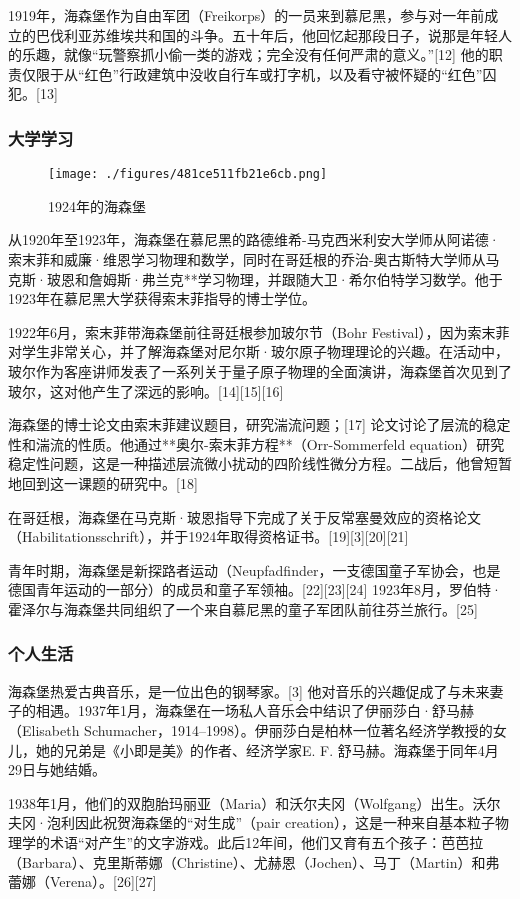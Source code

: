 1919年，海森堡作为自由军团（Freikorps）的一员来到慕尼黑，参与对一年前成立的巴伐利亚苏维埃共和国的斗争。五十年后，他回忆起那段日子，说那是年轻人的乐趣，就像“玩警察抓小偷一类的游戏；完全没有任何严肃的意义。”[12] 他的职责仅限于从“红色”行政建筑中没收自行车或打字机，以及看守被怀疑的“红色”囚犯。[13]  
\subsubsection{大学学习}
\begin{figure}[ht]
\centering
\texttt{[image: ./figures/481ce511fb21e6cb.png]}
\caption{1924年的海森堡} \label{fig_Heisen_1}
\end{figure}
从1920年至1923年，海森堡在慕尼黑的路德维希-马克西米利安大学师从阿诺德·索末菲和威廉·维恩学习物理和数学，同时在哥廷根的乔治-奥古斯特大学师从马克斯·玻恩和詹姆斯·弗兰克**学习物理，并跟随大卫·希尔伯特学习数学。他于1923年在慕尼黑大学获得索末菲指导的博士学位。  

1922年6月，索末菲带海森堡前往哥廷根参加玻尔节（Bohr Festival），因为索末菲对学生非常关心，并了解海森堡对尼尔斯·玻尔原子物理理论的兴趣。在活动中，玻尔作为客座讲师发表了一系列关于量子原子物理的全面演讲，海森堡首次见到了玻尔，这对他产生了深远的影响。[14][15][16]  

海森堡的博士论文由索末菲建议题目，研究湍流问题；[17] 论文讨论了层流的稳定性和湍流的性质。他通过**奥尔-索末菲方程**（Orr-Sommerfeld equation）研究稳定性问题，这是一种描述层流微小扰动的四阶线性微分方程。二战后，他曾短暂地回到这一课题的研究中。[18]  

在哥廷根，海森堡在马克斯·玻恩指导下完成了关于反常塞曼效应的资格论文（Habilitationsschrift），并于1924年取得资格证书。[19][3][20][21]  

青年时期，海森堡是新探路者运动（Neupfadfinder，一支德国童子军协会，也是德国青年运动的一部分）的成员和童子军领袖。[22][23][24] 1923年8月，罗伯特·霍泽尔与海森堡共同组织了一个来自慕尼黑的童子军团队前往芬兰旅行。[25]  
\subsubsection{个人生活}  
海森堡热爱古典音乐，是一位出色的钢琴家。[3] 他对音乐的兴趣促成了与未来妻子的相遇。1937年1月，海森堡在一场私人音乐会中结识了伊丽莎白·舒马赫（Elisabeth Schumacher，1914–1998）。伊丽莎白是柏林一位著名经济学教授的女儿，她的兄弟是《小即是美》的作者、经济学家E. F. 舒马赫。海森堡于同年4月29日与她结婚。  

1938年1月，他们的双胞胎玛丽亚（Maria）和沃尔夫冈（Wolfgang）出生。沃尔夫冈·泡利因此祝贺海森堡的“对生成”（pair creation），这是一种来自基本粒子物理学的术语“对产生”的文字游戏。此后12年间，他们又育有五个孩子：芭芭拉（Barbara）、克里斯蒂娜（Christine）、尤赫恩（Jochen）、马丁（Martin）和弗蕾娜（Verena）。[26][27]  


